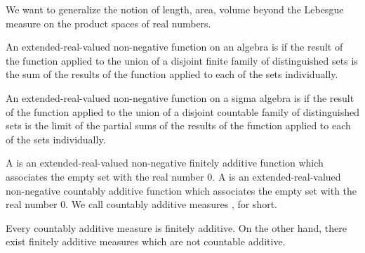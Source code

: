 
\sbasic

























\sstart
{}


We want to generalize the notion of length, area, volume beyond the Lebesgue measure on the product spaces of real numbers.


An extended-real-valued non-negative
function on an algebra is
if the result of the function applied to
the union of a disjoint finite family of
distinguished sets is the sum of the
results of the function applied to each
of the sets individually.

An extended-real-valued non-negative
function on a sigma algebra is
if the result of the function applied to
the union of a disjoint countable family of
distinguished sets is the limit of the partial
sums of the results of the function applied
to each of the sets individually.

A
is an extended-real-valued non-negative
finitely additive function which associates the empty
set with the real number $0$.
A
is an extended-real-valued non-negative
countably additive function which associates the empty
set with the real number $0$.
We call countably additive measures
, for short.

Every countably additive measure is finitely additive.
On the other hand, there exist finitely additive measures
which are not countable additive.

